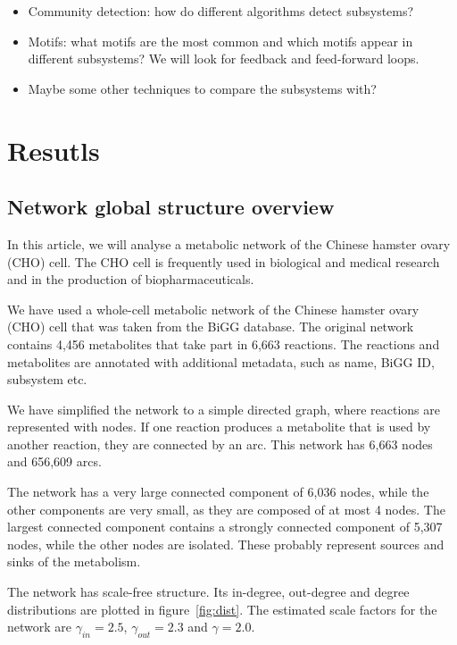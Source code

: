 \begin{itemize}
\item
  Community detection: how do different algorithms detect subsystems?
\item
  Motifs: what motifs are the most common and which motifs appear in different
  subsystems? We will look for feedback and feed-forward loops.
\item
  Maybe some other techniques to compare the subsystems with?
\end{itemize}

\section{Resutls}
\label{sec:results}

\subsection{Network global structure overview}

In this article, we will analyse a metabolic network of the Chinese hamster
ovary (CHO) cell. The CHO cell is frequently used in biological and medical
research and in the production of biopharmaceuticals\cite{chocons}.

We have used a whole-cell metabolic network of the Chinese hamster ovary (CHO)
cell that was taken from the BiGG database\cite{bigg,chocons}. The original
network contains 4,456 metabolites that take part in 6,663 reactions. The
reactions and metabolites are annotated with additional metadata, such as name,
BiGG ID, subsystem etc.

We have simplified the network to a simple directed graph, where reactions are
represented with nodes. If one reaction produces a metabolite that is used by
another reaction, they are connected by an arc. This network has 6,663 nodes and
656,609 arcs.

The network has a very large connected component of 6,036 nodes, while the other
components are very small, as they are composed of at most 4 nodes. The largest
connected component contains a strongly connected component of 5,307 nodes,
while the other nodes are isolated. These probably represent sources and sinks
of the metabolism.

The network has scale-free structure. Its in-degree, out-degree and degree
distributions are plotted in figure~\ref{fig:dist}. The estimated scale factors
for the network are $\gamma_{in} = 2.5$, $\gamma_{out} = 2.3$ and $\gamma =
2.0$. %

